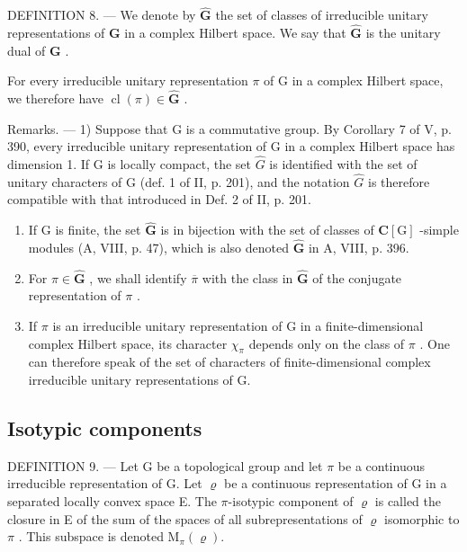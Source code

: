 DEFINITION 8. --- We denote by \(\widehat{\mathbf{G}}\) the set of classes of irreducible unitary representations of \(\mathbf{G}\) in a complex Hilbert space. We say that \(\widehat{\mathbf{G}}\) is the unitary dual of \(\mathbf{G}\) .

For every irreducible unitary representation \(\pi\) of G in a complex Hilbert space, we therefore have \(\operatorname{cl}(\pi) \in \widehat{\mathbf{G}}\) .

Remarks. --- 1) Suppose that G is a commutative group. By Corollary 7 of V, p. 390, every irreducible unitary representation of G in a complex Hilbert space has dimension 1. If G is locally compact, the set \(\widehat{G}\) is identified with the set of unitary characters of G (def. 1 of II, p. 201), and the notation \(\widehat{G}\) is therefore compatible with that introduced in Def. 2 of II, p. 201.

\begin{enumerate}
\def\labelenumi{\arabic{enumi})}
\setcounter{enumi}{1}
\item
  If G is finite, the set \(\widehat{\mathbf{G}}\) is in bijection with the set of classes of \(\mathbf{C}[\mathrm{G}]\) -simple modules (A, VIII, p. 47), which is also denoted \(\widehat{\mathbf{G}}\) in A, VIII, p. 396.
\item
  For \(\pi \in \widehat{\mathbf{G}}\) , we shall identify \(\overline{\pi}\) with the class in \(\widehat{\mathbf{G}}\) of the conjugate representation of \(\pi\) .
\item
  If \(\pi\) is an irreducible unitary representation of G in a finite-dimensional complex Hilbert space, its character \(\chi_{\pi}\) depends only on the class of \(\pi\) . One can therefore speak of the set of characters of finite-dimensional complex irreducible unitary representations of G.
\end{enumerate}

\subsection{Isotypic components}

DEFINITION 9. --- Let G be a topological group and let \(\pi\) be a continuous irreducible representation of G. Let \(\varrho\) be a continuous representation of G in a separated locally convex space E. The \(\pi\)-isotypic component of \(\varrho\) is called the closure in E of the sum of the spaces of all subrepresentations of \(\varrho\) isomorphic to \(\pi\) . This subspace is denoted \(\mathrm{M}_{\pi}(\varrho)\).

